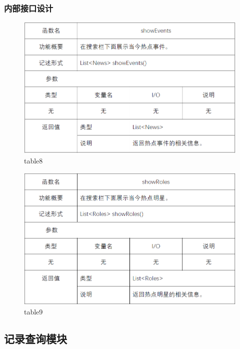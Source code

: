 \subsubsection{内部接口设计}
\begin{figure}[!htb]
	\centering
	\includegraphics[scale=1]{image/b8.png} %
	\caption{table8} %
\end{figure}
\begin{figure}[!htb]
	\centering
	\includegraphics[scale=1]{image/b9.png} %
	\caption{table9} %
\end{figure}
\subsection{记录查询模块}
